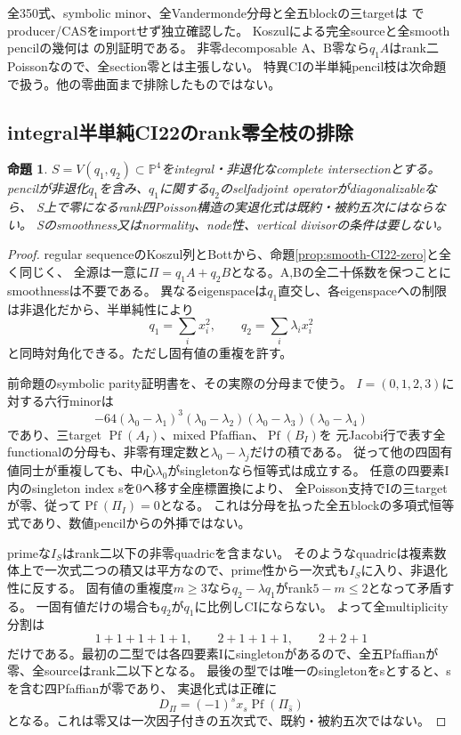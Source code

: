 \documentclass[a4paper,11pt]{ltjsarticle}
\newtheorem{proposition}{命題}[section]
\theoremstyle{definition}
\begin{document}
全350式、symbolic minor、全Vandermonde分母と全五blockの三targetは
でproducer/CASをimportせず独立確認した。
Koszulによる完全sourceと全smooth pencilの幾何は
の別証明である。
非零decomposable A、B零なら$q_1A$はrank二Poissonなので、全section零とは主張しない。
特異CIの半単純pencil枝は次命題で扱う。他の零曲面まで排除したものではない。

\subsection{integral半単純CI22のrank零全枝の排除}
\begin{proposition}\label{prop:semisimple-CI22-zero}
$S=V(q_1,q_2)\subset\mathbb P^4$をintegral・非退化なcomplete intersectionとする。
pencilが非退化$q_1$を含み、$q_1$に関する$q_2$のselfadjoint operatorがdiagonalizableなら、
S上で零になるrank四Poisson構造の実退化式は既約・被約五次にはならない。
Sのsmoothness又はnormality、node性、vertical divisorの条件は要しない。
\end{proposition}
\begin{proof}
regular sequenceのKoszul列とBottから、命題\ref{prop:smooth-CI22-zero}と全く同じく、
全源は一意に$\Pi=q_1A+q_2B$となる。A,Bの全二十係数を保つことにsmoothnessは不要である。
異なるeigenspaceは$q_1$直交し、各eigenspaceへの制限は非退化だから、半単純性により
\[
 q_1=\sum_i x_i^2,\qquad q_2=\sum_i\lambda_i x_i^2
\]
と同時対角化できる。ただし固有値の重複を許す。

前命題のsymbolic parity証明書を、その実際の分母まで使う。
$I=(0,1,2,3)$に対する六行minorは
\[
 -64(\lambda_0-\lambda_1)^3(\lambda_0-\lambda_2)
       (\lambda_0-\lambda_3)(\lambda_0-\lambda_4)
\]
であり、三target $\operatorname{Pf}(A_I)$、mixed Pfaffian、$\operatorname{Pf}(B_I)$を
元Jacobi行で表す全functionalの分母も、非零有理定数と$\lambda_0-\lambda_j$だけの積である。
従って他の四固有値同士が重複しても、中心$\lambda_0$がsingletonなら恒等式は成立する。
任意の四要素I内のsingleton index sを0へ移す全座標置換により、
全Poisson支持でIの三targetが零、従って$\operatorname{Pf}(\Pi_I)=0$となる。
これは分母を払った全五blockの多項式恒等式であり、数値pencilからの外挿ではない。

primeな$I_S$はrank二以下の非零quadricを含まない。
そのようなquadricは複素数体上で一次式二つの積又は平方なので、prime性から一次式も$I_S$に入り、非退化性に反する。
固有値の重複度$m\ge3$なら$q_2-\lambda q_1$がrank$5-m\le2$となって矛盾する。
一固有値だけの場合も$q_2$が$q_1$に比例しCIにならない。
よって全multiplicity分割は
\[
 1+1+1+1+1,\qquad2+1+1+1,\qquad2+2+1
\]
だけである。最初の二型では各四要素Iにsingletonがあるので、全五Pfaffianが零、全sourceはrank二以下となる。
最後の型では唯一のsingletonをsとすると、sを含む四Pfaffianが零であり、
実退化式は正確に
\[
 D_\Pi=(-1)^sx_s\operatorname{Pf}(\Pi_{\widehat s})
\]
となる。これは零又は一次因子付きの五次式で、既約・被約五次ではない。
\end{proof}
\end{document}
